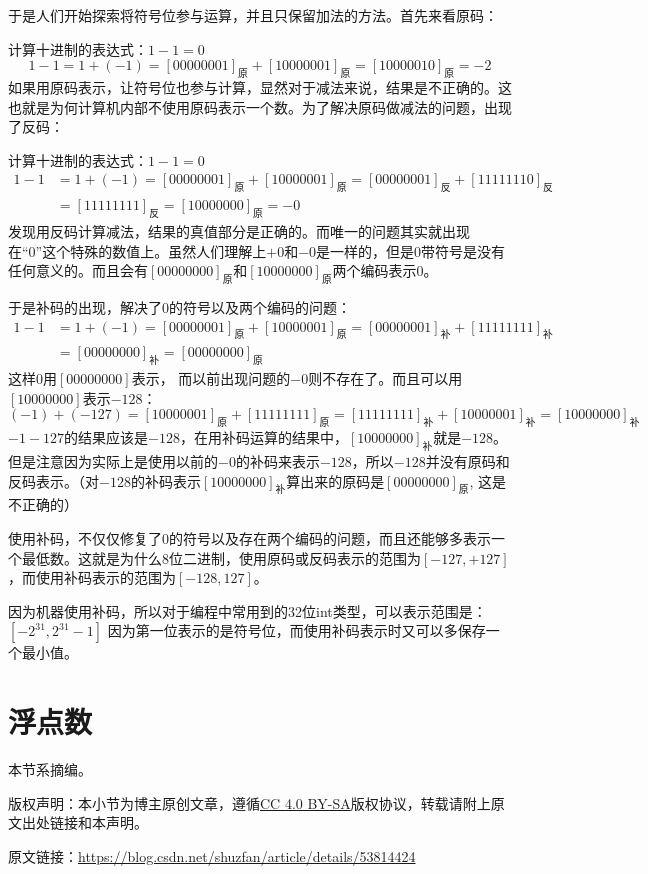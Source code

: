 于是人们开始探索将符号位参与运算，并且只保留加法的方法。首先来看原码：

计算十进制的表达式：$1-1=0$
$$1-1=1+(-1)=[00000001]_{\textrm{原}}+[10000001]_{\textrm{原}}=[10000010]_{\textrm{原}}=-2$$
如果用原码表示，让符号位也参与计算，显然对于减法来说，结果是不正确的。这也就是为何计算机内部不使用原码表示一个数。为了解决原码做减法的问题，出现了反码：

计算十进制的表达式：$1-1=0$
\[\begin{split}
1-1&=1+(-1)=[00000001]_{\textrm{原}}+[10000001]_{\textrm{原}}=[00000001]_{\textrm{反}}+[11111110]_{\textrm{反}}\\
&=[11111111]_{\textrm{反}}=[10000000]_{\textrm{原}}=-0
\end{split}\]
发现用反码计算减法，结果的真值部分是正确的。而唯一的问题其实就出现在“0”这个特殊的数值上。虽然人们理解上$+0$和$-0$是一样的，但是0带符号是没有任何意义的。而且会有$[00000000]_{\textrm{原}}$和$[10000000]_{\textrm{原}}$两个编码表示0。

于是补码的出现，解决了0的符号以及两个编码的问题：
\[\begin{split}
1-1&=1+(-1)=[00000001]_{\textrm{原}}+[10000001]_{\textrm{原}}=[00000001]_{\textrm{补}}+[11111111]_{\textrm{补}}\\
&=[00000000]_{\textrm{补}}=[00000000]_{\textrm{原}}
\end{split}\]
这样0用$[00000000]$表示， 而以前出现问题的$-0$则不存在了。而且可以用$[10000000]$表示$-128$：
$$(-1)+(-127)=[10000001]_{\textrm{原}}+[11111111]_{\textrm{原}}=[11111111]_{\textrm{补}}+[10000001]_{\textrm{补}}=[10000000]_{\textrm{补}}$$
$-1-127$的结果应该是$-128$，在用补码运算的结果中，$[1000 0000]_{\textrm{补}}$就是$-128$。但是注意因为实际上是使用以前的$-0$的补码来表示$-128$，所以$-128$并没有原码和反码表示。（对$-128$的补码表示$[10000000]_{\textrm{补}}$算出来的原码是$[0000 0000]_{\textrm{原}}$, 这是不正确的）

使用补码，不仅仅修复了0的符号以及存在两个编码的问题，而且还能够多表示一个最低数。这就是为什么8位二进制，使用原码或反码表示的范围为$[-127,+127]$，而使用补码表示的范围为$[-128,127]$。

因为机器使用补码，所以对于编程中常用到的32位int类型，可以表示范围是：$[-2^{31},2^{31}-1]$ 因为第一位表示的是符号位，而使用补码表示时又可以多保存一个最小值。

\section{浮点数}
\begin{note}
本节系摘编。

版权声明：本小节为博主原创文章，遵循\href{http://creativecommons.org/licenses/by-sa/4.0/}{CC 4.0 BY-SA}版权协议，转载请附上原文出处链接和本声明。

原文链接：\url{https://blog.csdn.net/shuzfan/article/details/53814424}
\end{note}

